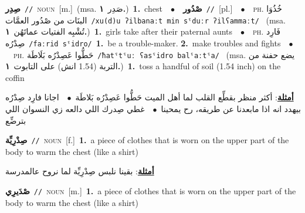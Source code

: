 \documentclass[10pt,a4paper,twoside]{article} %
\begin{document}
\begin{multicols}{2}
{\setlength\topsep{0pt}\textbf{\foreignlanguage{arabic}{صِدِر}}\ {\color{gray}\texttt{//}\color{black}}\ \textsc{noun}\ [m.]\ \color{gray}(msa. \foreignlanguage{arabic}{صَدِر}~\foreignlanguage{arabic}{\textbf{١.}})\color{black}\ \textbf{1.}~chest\ \ $\bullet$\ \ \setlength\topsep{0pt}\textbf{\foreignlanguage{arabic}{صْدُور}}\ {\color{gray}\texttt{//}\color{black}}\ [pl.]\ \ $\bullet$\ \ \textsc{ph.} \color{gray} \foreignlanguage{arabic}{خُذُوَا البنَات من صْدُور العمَّات}\color{black}\ {\color{gray}\texttt{/{\sffamily xu(d)u ʔilbanaːt min sˤduːr ʔilʕammaːt}/}\color{black}}\ \color{gray} (msa. \foreignlanguage{arabic}{تُشْبِه الفتيات عماتَهُن}~\foreignlanguage{arabic}{\textbf{١.}})\color{black}\ \textbf{1.}~girls take after their paternal aunts\ \ $\bullet$\ \ \textsc{ph.} \color{gray} \foreignlanguage{arabic}{فَارِد صِدْرُه}\color{black}\ {\color{gray}\texttt{/{\sffamily faːrid sˤidro}/}\color{black}}\ \textbf{1.}~be a trouble-maker.  \textbf{2.}~make troubles and fights\ \ $\bullet$\ \ \textsc{ph.} \color{gray} \foreignlanguage{arabic}{حَطُّوا عَصِدْرُه بَلَاطَة}\color{black}\ {\color{gray}\texttt{/{\sffamily ħatˤtˤuː ʕasˤidro balˤaːtˤa}/}\color{black}}\ \color{gray} (msa. \foreignlanguage{arabic}{يضع حفنة من التربة (1.54 انش) على التابوت}~\foreignlanguage{arabic}{\textbf{١.}})\color{black}\ \textbf{1.}~toss a handful of soil (1.54 inch) on the coffin\  \begin{flushright}\color{gray}\foreignlanguage{arabic}{\textbf{\underline{\foreignlanguage{arabic}{أمثلة}}}: أكثر منظر بقطِّع القلب لما أهل الميت حَطُّوا عَصِدْرُه بَلاطَة\ $\bullet$\ \  اجانا فارِد صِدْرُه بيهدد انه اذا مابعدنا عن طريقه، رح يمحينا\ $\bullet$\ \  غطي صِدرك اللي دالعه زي النسوان اللي بترضِّع}\end{flushright}\color{black}} \vspace{2mm}

{\setlength\topsep{0pt}\textbf{\foreignlanguage{arabic}{صِدْرِيِّة}}\ {\color{gray}\texttt{//}\color{black}}\ \textsc{noun}\ [f.]\ \textbf{1.}~a piece of clothes that is worn on the upper part of the body to warm the chest (like a shirt)\  \begin{flushright}\color{gray}\foreignlanguage{arabic}{\textbf{\underline{\foreignlanguage{arabic}{أمثلة}}}: بقينا نلبس صِدْرِيِّة لما نروح عالمدرسة}\end{flushright}\color{black}} \vspace{2mm}

{\setlength\topsep{0pt}\textbf{\foreignlanguage{arabic}{صْدَيرِي}}\ {\color{gray}\texttt{//}\color{black}}\ \textsc{noun}\ [m.]\ \textbf{1.}~a piece of clothes that is worn on the upper part of the body to warm the chest (like a shirt)\ } \vspace{2mm}


\end{multicols}
\end{document}
